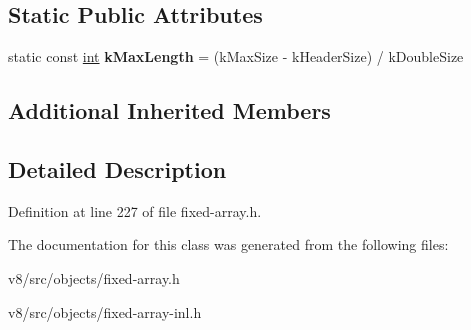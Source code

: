 \subsection*{Static Public Attributes}
\begin{DoxyCompactItemize}
\item 
\mbox{\label{classv8_1_1internal_1_1FixedDoubleArray_af65b3ad9319ef84e8ae0f878b7556d92}} 
static const \mbox{\hyperlink{classint}{int}} {\bfseries k\+Max\+Length} = (k\+Max\+Size -\/ k\+Header\+Size) / k\+Double\+Size
\end{DoxyCompactItemize}
\subsection*{Additional Inherited Members}


\subsection{Detailed Description}


Definition at line 227 of file fixed-\/array.\+h.



The documentation for this class was generated from the following files\+:\begin{DoxyCompactItemize}
\item 
v8/src/objects/fixed-\/array.\+h\item 
v8/src/objects/fixed-\/array-\/inl.\+h\end{DoxyCompactItemize}

